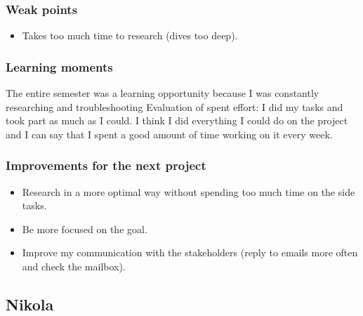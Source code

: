 \documentclass[10pt, a4paper]{article}
\begin{document}
\subsubsection{Weak points}
\begin{itemize}
	\item Takes too much time to research (dives too deep).
\end{itemize}

\subsubsection{Learning moments}

The entire semester was a learning opportunity because I was constantly researching and troubleshooting Evaluation of spent effort: I did my tasks and took part as much as I could. I think I did everything I could do on the project and I can say that I spent a good amount of time working on it every week.


\subsubsection{Improvements for the next project}
\begin{itemize}
    \item Research in a more optimal way without spending too much time on the side tasks.
    \item Be more focused on the goal.
    \item Improve my communication with the stakeholders (reply to emails more often and check the mailbox).
\end{itemize}


\subsection{Nikola}
\end{document}
